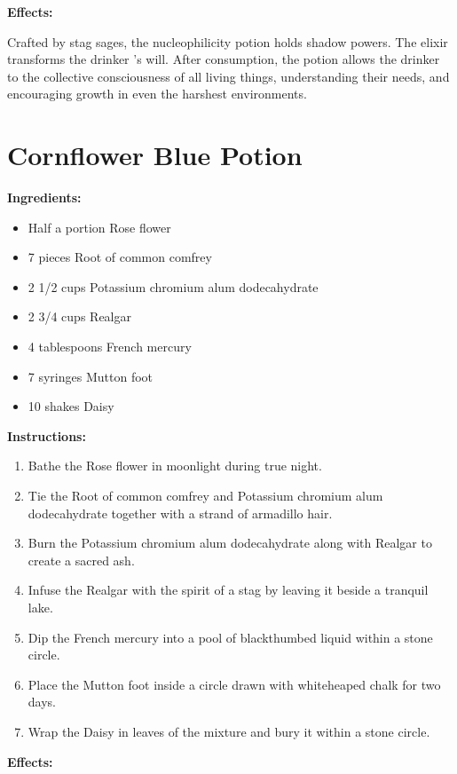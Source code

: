 \documentclass{article}
\begin{document}
\textbf{Effects:}

Crafted by stag sages, the nucleophilicity potion holds shadow powers. The elixir transforms the drinker 's will. After consumption, the potion allows the drinker to the collective consciousness of all living things, understanding their needs, and encouraging growth in even the harshest environments.

\newpage
\section*{Cornflower Blue Potion}

\textbf{Ingredients:}

\begin{itemize}
  \item Half a portion Rose flower
  \item 7 pieces Root of common comfrey
  \item 2 1/2 cups Potassium chromium alum dodecahydrate
  \item 2 3/4 cups Realgar
  \item 4 tablespoons French mercury
  \item 7 syringes Mutton foot
  \item 10 shakes Daisy
\end{itemize}

\textbf{Instructions:}

\begin{enumerate}
  \item Bathe the Rose flower in moonlight during true night.
  \item Tie the Root of common comfrey and Potassium chromium alum dodecahydrate together with a strand of armadillo hair.
  \item Burn the Potassium chromium alum dodecahydrate along with Realgar to create a sacred ash.
  \item Infuse the Realgar with the spirit of a stag by leaving it beside a tranquil lake.
  \item Dip the French mercury into a pool of blackthumbed liquid within a stone circle.
  \item Place the Mutton foot inside a circle drawn with whiteheaped chalk for two days.
  \item Wrap the Daisy in leaves of the mixture and bury it within a stone circle.
\end{enumerate}

\textbf{Effects:}
\end{document}
